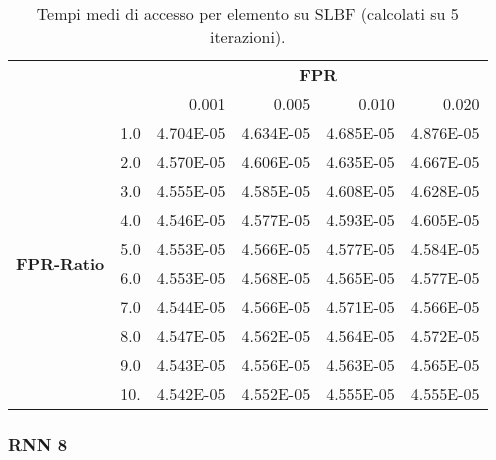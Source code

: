 \documentclass[4apaper,11pt]{report}
\begin{document}
    \begin{table}[H]
        \centering
        \begin{tabular}{llrrrr}
        \toprule
        {} & & \multicolumn{4}{c}{\textbf{FPR}}\\
        {} & &    0.001 &     0.005 &     0.010 &     0.020 \\
        \midrule
        \multirow{10}{*}{\textbf{FPR-Ratio}} &1.0 & 4.704E-05 & 4.634E-05 & 4.685E-05 & 4.876E-05 \\
        &2.0 & 4.570E-05 & 4.606E-05 & 4.635E-05 & 4.667E-05 \\
        &3.0 & 4.555E-05 & 4.585E-05 & 4.608E-05 & 4.628E-05 \\
        &4.0 & 4.546E-05 & 4.577E-05 & 4.593E-05 & 4.605E-05 \\
        &5.0 & 4.553E-05 & 4.566E-05 & 4.577E-05 & 4.584E-05 \\
        &6.0 & 4.553E-05 & 4.568E-05 & 4.565E-05 & 4.577E-05 \\
        &7.0 & 4.544E-05 & 4.566E-05 & 4.571E-05 & 4.566E-05 \\
        &8.0 & 4.547E-05 & 4.562E-05 & 4.564E-05 & 4.572E-05 \\
        &9.0 & 4.543E-05 & 4.556E-05 & 4.563E-05 & 4.565E-05 \\
        &10. & 4.542E-05 & 4.552E-05 & 4.555E-05 & 4.555E-05 \\
        \bottomrule
        \end{tabular}
        \caption{Tempi medi di accesso per elemento su SLBF (calcolati su 5 iterazioni).}
    \end{table}

    \subsubsection{RNN 8}
\end{document}
